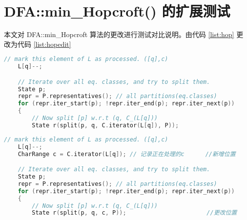 \chapter{DFA::min\_Hopcroft() 的扩展测试}
本文对 DFA::min\_Hopcroft 算法的更改进行测试对比说明。由代码 \ref{list:hop} 更改为代码 \ref{list:hopedit}
\lstset{style=mystyle}
\begin{lstlisting}[language=c++,label={list:hop},caption={原始的 Hopcroft}]
    // mark this element of L as processed. ([q],c)
    L[q]--;

    // Iterate over all eq. classes, and try to split them.
    State p;
    repr = P.representatives(); // all partitions(eq.classes)
    for (repr.iter_start(p); !repr.iter_end(p); repr.iter_next(p))
    {
        // Now split [p] w.r.t (q, C_(L[q]))
        State r(split(p, q, C.iterator(L[q]), P)); 
\end{lstlisting}

\begin{lstlisting}[language=c++,label={list:hopedit},caption={更改后的 Hopcroft}]
    // mark this element of L as processed. ([q],c)
    L[q]--;
    CharRange c = C.iterator(L[q]); // 记录正在处理的c      //新增位置

    // Iterate over all eq. classes, and try to split them.
    State p;
    repr = P.representatives(); // all partitions(eq.classes)
    for (repr.iter_start(p); !repr.iter_end(p); repr.iter_next(p))
    {
        // Now split [p] w.r.t (q, C_(L[q]))
        State r(split(p, q, c, P));                       //更改位置
\end{lstlisting}



